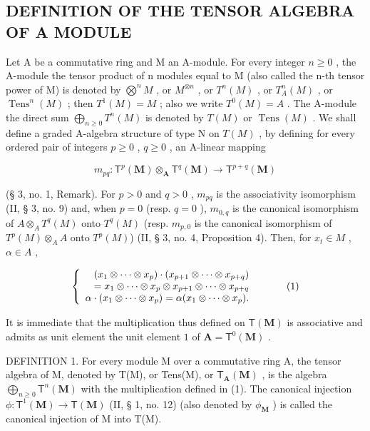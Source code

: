 \subsection{DEFINITION OF THE TENSOR ALGEBRA OF A MODULE}

Let A be a commutative ring and M an A-module. For every integer \(n \geqslant 0\) , the A-module the tensor product of n modules equal to M (also called the n-th tensor power of M) is denoted by \(\bigotimes^{n} M\) , or \(M^{\otimes n}\) , or \(T^{n}(M)\) , or \(T_{A}^{n}(M)\) , or \(\operatorname{Tens}^{n}(M)\) ; then \(T^{1}(M) = M\) ; also we write \(T^{0}(M) = A\) . The A-module the direct sum \(\bigoplus_{n \geqslant 0} T^{n}(M)\) is denoted by \(T(M)\) or \(\operatorname{Tens}(M)\) . We shall define a graded A-algebra structure of type N on \(T(M)\) , by defining for every ordered pair of integers \(p \geqslant 0\) , \(q \geqslant 0\) , an A-linear mapping

\[
m _ {p q} \colon \mathsf {T} ^ {p} (\mathbf {M}) \otimes_ {\mathbf {A}} \mathsf {T} ^ {q} (\mathbf {M}) \rightarrow \mathsf {T} ^ {p + q} (\mathbf {M})
\]

(§ 3, no. 1, Remark). For \(p > 0\) and \(q > 0\) , \(m_{pq}\) is the associativity isomorphism (II, § 3, no. 9) and, when \(p = 0\) (resp. \(q = 0\) ), \(m_{0,q}\) is the canonical isomorphism of \(A \otimes_A T^q(M)\) onto \(T^q(M)\) (resp. \(m_{p,0}\) is the canonical isomorphism of \(T^p(M) \otimes_A A\) onto \(T^p(M)\)) (II, § 3, no. 4, Proposition 4). Then, for \(x_t \in M\) , \(\alpha \in A\) ,

\[
\left\{ \begin{array}{r l} (x _ {1} \otimes \dots \otimes x _ {p}) \cdot (x _ {p + 1} \otimes \dots \otimes x _ {p + q}) & \\ = x _ {1} \otimes \dots \otimes x _ {p} \otimes x _ {p + 1} \otimes \dots \otimes x _ {p + q} \\ \alpha \cdot (x _ {1} \otimes \dots \otimes x _ {p}) = \alpha (x _ {1} \otimes \dots \otimes x _ {p}). \end{array} \right.\tag{1}
\]

It is immediate that the multiplication thus defined on \(\mathsf{T}(\mathbf{M})\) is associative and admits as unit element the unit element \(1\) of \(\mathbf{A} = \mathsf{T}^0 (\mathbf{M})\) .

DEFINITION 1. For every module M over a commutative ring A, the tensor algebra of M, denoted by T(M), or Tens(M), or \(\mathsf{T}_{\mathbf{A}}(\mathbf{M})\) , is the algebra \(\bigoplus_{n\geqslant 0}\mathsf{T}^n (\mathbf{M})\) with the multiplication defined in (1). The canonical injection \(\phi :\mathsf{T}^{1}(\mathbf{M})\to \mathsf{T}(\mathbf{M})\) (II, § 1, no. 12) (also denoted by \(\phi_{\mathbf{M}}\) ) is called the canonical injection of M into T(M).

